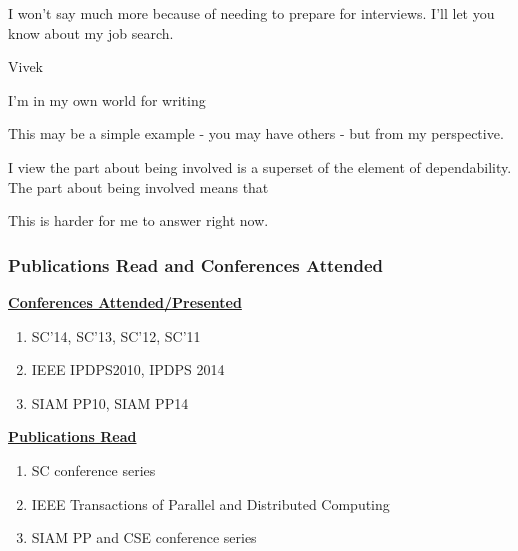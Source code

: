 \begin{frame}
I won't say much more because of needing to prepare for
interviews. I'll let you know about my job search.

Vivek
















I'm in my own world for writing
 
This may be a simple example - you may have others - but from my perspective. 

I view the part about being involved is a superset of the element of
dependability. The part about being involved means that 

This is harder for me to answer right now. 




\end{frame} 



\begin{frame} 
\frametitle{Publications Read and Conferences Attended} 
\underline{\textbf{Conferences Attended/Presented}}\\
\begin{enumerate} 
\tiny \item \tiny SC'14, SC'13, SC'12, SC'11
\item \tiny IEEE IPDPS2010, IPDPS 2014 
\item \tiny SIAM PP10, SIAM PP14
\end{enumerate}
\underline{\textbf{Publications Read}}\\
\begin{enumerate}
\tiny \item \tiny SC conference series 
\tiny \item \tiny IEEE Transactions of Parallel and Distributed Computing 
\tiny \item \tiny SIAM PP and CSE conference series 
\end{enumerate} 
\end{frame}

